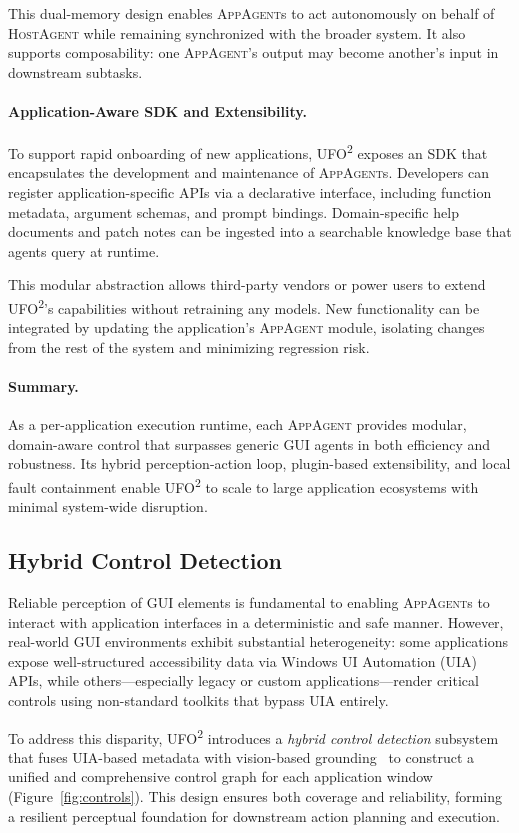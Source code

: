 \documentclass[sigplan,10pt]{acmart}
\newcommand{\name}{\textsc{UFO}\textsuperscript{2}\xspace}
\newcommand{\hosta}{\textsc{HostAgent}\xspace}
\newcommand{\appa}{\textsc{AppAgent}\xspace}
\newcommand{\appas}{\textsc{AppAgent}s\xspace}
\begin{document}
This dual-memory design enables \appas to act autonomously on behalf of \hosta while remaining synchronized with the broader system. It also supports composability: one \appa's output may become another's input in downstream subtasks.

\paragraph{Application-Aware SDK and Extensibility.}
To support rapid onboarding of new applications, \name exposes an SDK that encapsulates the development and maintenance of \appas. Developers can register application-specific APIs via a declarative interface, including function metadata, argument schemas, and prompt bindings. Domain-specific help documents and patch notes can be ingested into a searchable knowledge base that agents query at runtime.

This modular abstraction allows third-party vendors or power users to extend \name's capabilities without retraining any models. New functionality can be integrated by updating the application's \appa module, isolating changes from the rest of the system and minimizing regression risk.

\paragraph{Summary.}
As a per-application execution runtime, each \appa provides modular, domain-aware control that surpasses generic GUI agents in both efficiency and robustness. Its hybrid perception-action loop, plugin-based extensibility, and local fault containment enable \name to scale to large application ecosystems with minimal system-wide disruption.


\subsection{Hybrid Control Detection}
\label{sec:hybrid-control}
Reliable perception of GUI elements is fundamental to enabling \appas to interact with application interfaces in a deterministic and safe manner. However, real-world GUI environments exhibit substantial heterogeneity: some applications expose well-structured accessibility data via Windows UI Automation (UIA) APIs, while others—especially legacy or custom applications—render critical controls using non-standard toolkits that bypass UIA entirely.

To address this disparity, \name introduces a \emph{hybrid control detection} subsystem that fuses UIA-based metadata with vision-based grounding~\cite{lu2024omniparser, cheng2024seeclick, gou2024navigating} to construct a unified and comprehensive control graph for each application window (Figure~\ref{fig:controls}). This design ensures both coverage and reliability, forming a resilient perceptual foundation for downstream action planning and execution.
\end{document}
